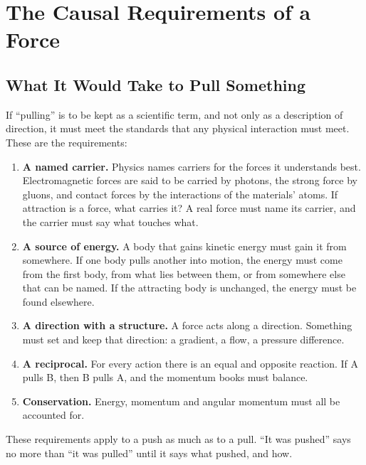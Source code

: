 \documentclass[11pt,a4paper]{article}
\begin{document}
\section{The Causal Requirements of a Force}

\subsection*{What It Would Take to Pull Something}

If ``pulling'' is to be kept as a scientific term, and not only as a description of direction, it must meet the standards that any physical interaction must meet. These are the requirements:

\begin{enumerate}
  \item \textbf{A named carrier.} Physics names carriers for the forces it understands best. Electromagnetic forces are said to be carried by photons, the strong force by gluons, and contact forces by the interactions of the materials' atoms. If attraction is a force, what carries it? A real force must name its carrier, and the carrier must say what touches what.

  \item \textbf{A source of energy.} A body that gains kinetic energy must gain it from somewhere. If one body pulls another into motion, the energy must come from the first body, from what lies between them, or from somewhere else that can be named. If the attracting body is unchanged, the energy must be found elsewhere.

  \item \textbf{A direction with a structure.} A force acts along a direction. Something must set and keep that direction: a gradient, a flow, a pressure difference.

  \item \textbf{A reciprocal.} For every action there is an equal and opposite reaction. If A pulls B, then B pulls A, and the momentum books must balance.

  \item \textbf{Conservation.} Energy, momentum and angular momentum must all be accounted for.
\end{enumerate}

These requirements apply to a push as much as to a pull.  ``It was pushed'' says no more than ``it was pulled'' until it says what pushed, and how.
\end{document}
